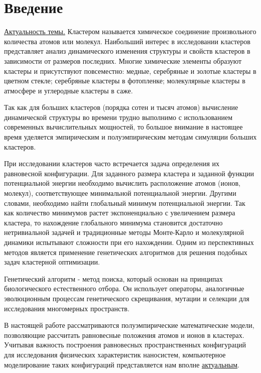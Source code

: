 \newpage


\section*{Введение}



\underline{\noindent Актуальность темы.} Кластером называется химическое
соединение произвольного количества атомов или молекул.  Наибольший интерес в
исследовании кластеров представляет анализ динамического изменения структуры и
свойств кластеров в зависимости от размеров последних.  Многие химические
элементы образуют кластеры и присутствуют повсеместно: медные, серебряные и
золотые кластеры в цветном стекле; серебряные кластеры в фотопленке;
молекулярные кластеры в атмосфере и углеродные кластеры в саже.

Так как для больших кластеров (порядка сотен и тысяч атомов) вычисление
динамической структуры во времени трудно выполнимо с
использованием современных вычислительных мощностей, то большое внимание
в настоящее время уделяется эмпирическим и полуэмпирическим методам симуляции больших кластеров.

При исследовании кластеров часто встречается задача определения их равновесной
конфигурации.  Для заданного размера кластера и заданной функции потенциальной
энергии необходимо вычислить расположение атомов (ионов, молекул),
соответствующее минимальной потенциальной энергии. Другими словами, необходимо
найти глобальный минимум потенциальной энергии. Так как количество минимумов
растет экспоненциально с увеличением размера кластера, то нахождение
глобального минимума становится достаточно нетривиальной задачей и традиционные
методы Монте-Карло и молекулярной динамики испытывают сложности при его
нахождении. Одним из перспективных методов является применение генетических
алгоритмов для решения подобных задач кластерной оптимизации.

Генетический алгоритм - метод поиска, который основан на принципах биологического
естественного отбора. Он использует операторы, аналогичные эволюционным процессам генетического
скрещивания, мутации и селекции для исследования многомерных пространств.

В настоящей работе рассматриваются полуэмпирические математические модели, позволяющие рассчитать
равновесные положения атомов и ионов в кластерах. Учитывая важность построения равновесных пространственных
конфигураций для исследования физических характеристик наносистем, компьютерное моделирование таких конфигураций
представляется нам вполне \underline{актуальным}.

